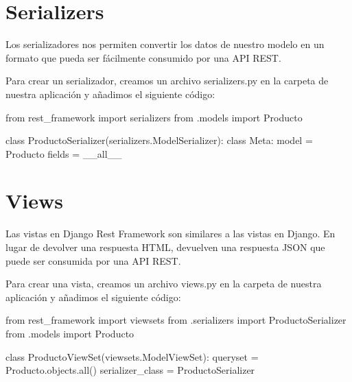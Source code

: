 \documentclass[
  a4paper,
  DIV=11,
  numbers=noendperiod,
  onepage,
  openany]{scrreprt}
\newenvironment{Shaded}{\begin{snugshade}}{\end{snugshade}}
\newcommand{\BuiltInTok}[1]{\textcolor[rgb]{0.00,0.23,0.31}{#1}}
\newcommand{\ImportTok}[1]{\textcolor[rgb]{0.00,0.46,0.62}{#1}}
\newcommand{\KeywordTok}[1]{\textcolor[rgb]{0.00,0.23,0.31}{#1}}
\newcommand{\NormalTok}[1]{\textcolor[rgb]{0.00,0.23,0.31}{#1}}
\newcommand{\OperatorTok}[1]{\textcolor[rgb]{0.37,0.37,0.37}{#1}}
\newcommand{\StringTok}[1]{\textcolor[rgb]{0.13,0.47,0.30}{#1}}
\begin{document}
\section{Serializers}\label{serializers}

Los serializadores nos permiten convertir los datos de nuestro modelo en
un formato que pueda ser fácilmente consumido por una API REST.

Para crear un serializador, creamos un archivo serializers.py en la
carpeta de nuestra aplicación y añadimos el siguiente código:

\begin{Shaded}
\begin{Highlighting}[]
\ImportTok{from}\NormalTok{ rest\_framework }\ImportTok{import}\NormalTok{ serializers}
\ImportTok{from}\NormalTok{ .models }\ImportTok{import}\NormalTok{ Producto}

\KeywordTok{class}\NormalTok{ ProductoSerializer(serializers.ModelSerializer):}
    \KeywordTok{class}\NormalTok{ Meta:}
\NormalTok{        model }\OperatorTok{=}\NormalTok{ Producto}
\NormalTok{        fields }\OperatorTok{=} \StringTok{\textquotesingle{}\_\_all\_\_\textquotesingle{}}
\end{Highlighting}
\end{Shaded}

\section{Views}\label{views}

Las vistas en Django Rest Framework son similares a las vistas en
Django. En lugar de devolver una respuesta HTML, devuelven una respuesta
JSON que puede ser consumida por una API REST.

Para crear una vista, creamos un archivo views.py en la carpeta de
nuestra aplicación y añadimos el siguiente código:

\begin{Shaded}
\begin{Highlighting}[]
\ImportTok{from}\NormalTok{ rest\_framework }\ImportTok{import}\NormalTok{ viewsets}
\ImportTok{from}\NormalTok{ .serializers }\ImportTok{import}\NormalTok{ ProductoSerializer}
\ImportTok{from}\NormalTok{ .models }\ImportTok{import}\NormalTok{ Producto}

\KeywordTok{class}\NormalTok{ ProductoViewSet(viewsets.ModelViewSet):}
\NormalTok{    queryset }\OperatorTok{=}\NormalTok{ Producto.objects.}\BuiltInTok{all}\NormalTok{()}
\NormalTok{    serializer\_class }\OperatorTok{=}\NormalTok{ ProductoSerializer}
\end{Highlighting}
\end{Shaded}
\end{document}
